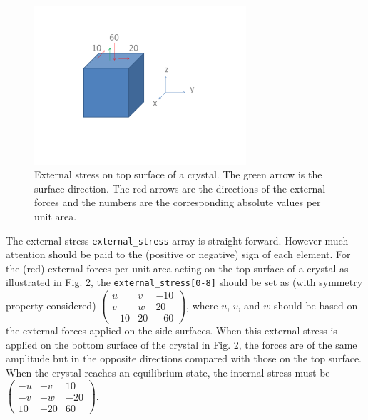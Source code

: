 \documentclass[aps]{revtex4}
\begin{document}
\newpage


  \vspace{0cm}
\begin{figure}
  \begin{center}
    \hspace{0cm}
    \includegraphics[width=0.7\textwidth]{./anexternalstressexample2.pdf}
  \end{center}
  \vspace{-3cm}
  \caption{External stress on top surface of a crystal. The green arrow is the surface direction. The red arrows are the directions of the external forces and the numbers are the corresponding absolute values per unit area.}
  \label{fig2}
\end{figure}

  \vspace{2cm}
The external stress \verb!external_stress! array is straight-forward. However much attention should be paid to the (positive or negative) sign of each element. For the (red) external forces per unit area acting on the top surface of a crystal as illustrated in Fig. 2, the \verb!external_stress[0-8]! should be set as (with symmetry property considered)
  $ \left( \begin{array}{rrr}
           u &   v &    -10 \\ 
           v &  w &  20 \\ 
           -10 &  20 &   -60
            \end{array}
     \right)  
  $,
where $u$, $v$, and $w$ should be based on the external forces applied on the side surfaces. When this external stress is applied on the bottom surface of the crystal in Fig. 2, the forces are of the same amplitude but in the opposite directions compared with those on the top surface. When the crystal reaches an equilibrium state, the internal stress must be
  $ \left( \begin{array}{rrr}
           -u &  - v &    10 \\ 
           -v &  -w &  -20 \\ 
           10 &  -20 &  60
            \end{array}
     \right)  
  $.
\end{document}
